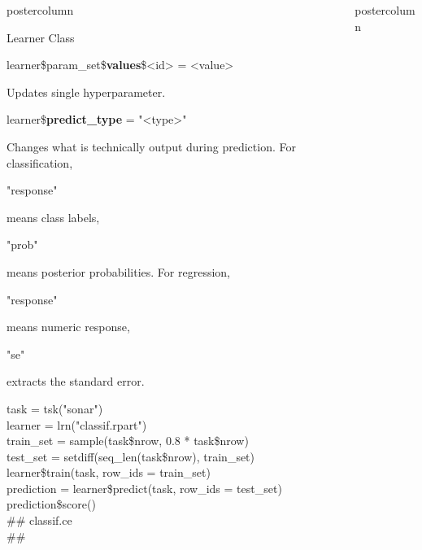 \documentclass{beamer}
\newlength{\columnheight} %
\newcommand{\codeinline}[1]{\begin{codeboxinline}#1\end{codeboxinline}}
\begin{document}
\begin{frame}[fragile]{}
\begin{columns}
\begin{column}{.245\textwidth}
\begin{beamercolorbox}[center]{postercolumn}
\begin{minipage}{.98\textwidth}
{\begin{myblock}{Learner Class}
							\\
							\begin{codebox}
								learner\$param\_set\$\textbf{values}\$<id> = <value>
							\end{codebox}
							Updates single hyperparameter.
							\vspace{1em}
							\\
							\begin{codebox}
								learner\$\textbf{predict\_type} = "<type>"
							\end{codebox}
							Changes what is technically output during prediction. For classification, 
	                        \codeinline{"response"} means class labels, \codeinline{"prob"} means posterior probabilities.
	                        For regression, \codeinline{"response"} means numeric response, 
	                        \codeinline{"se"} extracts the standard error.
							\vspace{1em}
							\begin{codeboxexample}
								{\scriptsize
									task = tsk("sonar")\\
									learner = lrn("classif.rpart")
									\vspace{1em}
									\\
									train\_set = sample(task\$nrow, 0.8 * task\$nrow)\\
									test\_set = setdiff(seq\_len(task\$nrow), train\_set)
									\vspace{1em}
									\\
									learner\$train(task, row\_ids = train\_set)
									\vspace{1em}
									\\
									prediction = learner\$predict(task, row\_ids = test\_set)\\
									prediction\$score()\\
									\#\# classif.ce\\
									\#\# }
							\end{codeboxexample}
						\end{myblock}
					\vfill}
				\end{minipage}
			\end{beamercolorbox}
		\end{column}
		\begin{column}{.245\textwidth}
			\begin{beamercolorbox}[center]{postercolumn}
				\begin{minipage}{.98\textwidth}
					\parbox[t][\columnheight]{\textwidth}{
}
\end{minipage}
\end{beamercolorbox}
\end{column}
\end{columns}
\end{frame}
\end{document}
